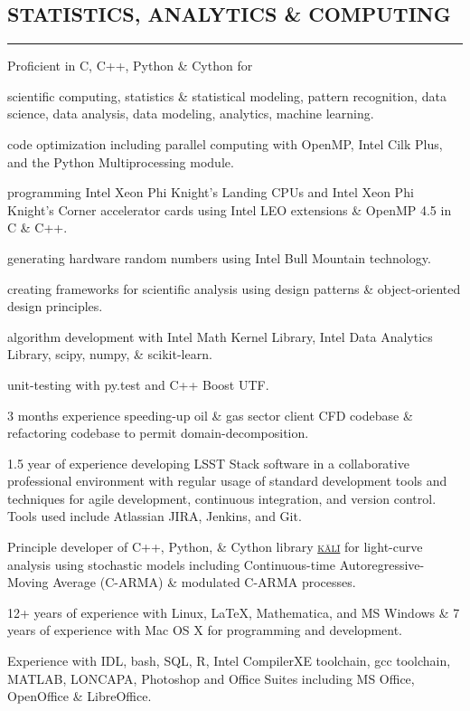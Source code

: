 \documentclass[10pt,a4]{article}
\newcounter{myEnumCounter}
\newcounter{mySaveCounter}
\renewenvironment{enumerate}{%
  \begin{list}{\arabic{myEnumCounter}.}{\usecounter{myEnumCounter}%
  \setcounter{myEnumCounter}{\value{mySaveCounter}}}
  }{%
  \setcounter{mySaveCounter}{\value{myEnumCounter}}\end{list}%
}
\newcommand\myEnumReset{\setcounter{mySaveCounter}{0}}
\begin{document}
\subsection*{STATISTICS, ANALYTICS \& COMPUTING}
\hrule  height 4pt
\vspace{0.2cm}
\begin{itemize}
\item Proficient in C, C++, Python \& Cython for
	\begin{enumerate}
		\item scientific computing, statistics \& statistical modeling, pattern recognition, data science, data analysis, data modeling, analytics, machine learning.
		\item code optimization including parallel computing with OpenMP, Intel Cilk Plus, and the Python Multiprocessing module.
		\item programming Intel Xeon Phi Knight's Landing CPUs and Intel Xeon Phi Knight's Corner accelerator cards using Intel LEO extensions \& OpenMP 4.5 in C \& C++.
		\item generating hardware random numbers using Intel Bull Mountain technology.
    \item creating frameworks for scientific analysis using design patterns \& object-oriented design principles.
    \item algorithm development with Intel Math Kernel Library, Intel Data Analytics Library, scipy, numpy, \& scikit-learn.
    \item unit-testing with py.test and C++ Boost UTF.
	\end{enumerate}
\item 3 months experience speeding-up oil \& gas sector client CFD codebase \& refactoring codebase to permit domain-decomposition.
\item 1.5 year of experience developing LSST Stack software in a collaborative professional environment with regular usage of standard development tools and techniques for agile development, continuous integration, and version control. Tools used include Atlassian JIRA, Jenkins, and Git.
\item Principle developer of C++, Python, \& Cython library \href{https://github.com/AstroVPK/kali}{\textsc{k\={a}l\={i}}} for light-curve analysis using stochastic models including Continuous-time Autoregressive-Moving Average (C-ARMA) \& modulated C-ARMA processes.
\item 12+ years of experience with Linux, \LaTeX, Mathematica, and MS Windows \& 7 years of experience with Mac OS X for programming and development.
\item Experience with IDL, bash, SQL, R, Intel CompilerXE toolchain, gcc toolchain, MATLAB, LONCAPA, Photoshop and Office Suites including MS Office, OpenOffice \& LibreOffice.
\end{itemize}
\myEnumReset
\end{document}

